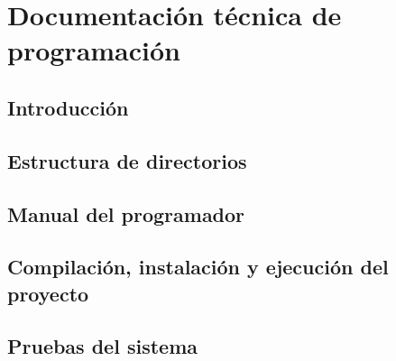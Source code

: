 \chapter{Documentación técnica de programación} %
\label{cha:Documentación técnica de programación}

\section{Introducción}

\section{Estructura de directorios}

\section{Manual del programador}

\section{Compilación, instalación y ejecución del proyecto}

\section{Pruebas del sistema}

